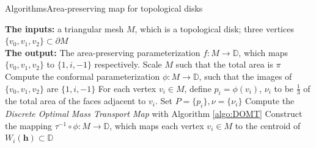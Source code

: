 \documentclass{beamer}
\theoremstyle{definition}
\begin{document}
\begin{frame}{Algorithms}{Area-preserving map for topological disks}
\begin{algorithm}[H]
\caption{Topological Disk Area-preserving Parameterization}
\begin{algorithmic}[1]
	\REQUIRE \textbf{The inputs:} a triangular mesh $M$, which is a topological disk; three vertices $\{v_0,v_1,v_2\}\subset \partial M$ \\
	\textbf{The output:} The area-preserving parameterization $f:M\rightarrow \mathbb{D}$, which maps $\{v_0,v_1,v_2\}$ to $\{1,i,-1\}$ respectively.
	\STATE Scale $M$ such that the total area is $\pi$
	\STATE Compute the conformal parameterization $\phi:M\rightarrow\mathbb{D}$, such that the images of $\{v_0,v_1,v_2\}$ are $\{1,i,-1\}$
	\STATE For each vertex $v_i\in M$, define $p_i=\phi(v_i)$, $\nu_i$ to be $\frac{1}{3}$ of the total area of the faces adjacent to $v_i$. Set $P=\{p_i\},\nu=\{\nu_i\}$
	\STATE Compute the \textit{Discrete Optimal Mass Transport Map} with Algorithm \ref{algo:DOMT}
	\STATE Construct the mapping $\tau^{-1}\circ\phi:M\rightarrow\mathbb{D}$, which maps each vertex $v_i\in M$ to the centroid of $W_i(\mathbf{h})\subset \mathbb{D}$
\end{algorithmic}
\end{algorithm}
\end{frame}

\end{document}
